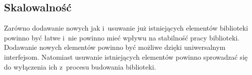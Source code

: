 \documentclass[11pt,twoside,a4paper,final]{article}
\begin{document}

\subsection{Skalowalność}
Zarówno dodawanie nowych jak i~usuwanie już istniejących elementów biblioteki powinno być łatwe i~nie powinno mieć wpływu na stabilność pracy biblioteki. Dodawanie nowych elementów powinno być możliwe dzięki uniwersalnym interfejsom. Natomiast usuwanie istniejących elementów powinno sprowadzać się do wyłączenia ich z~procesu budowania biblioteki.


\end{document}

